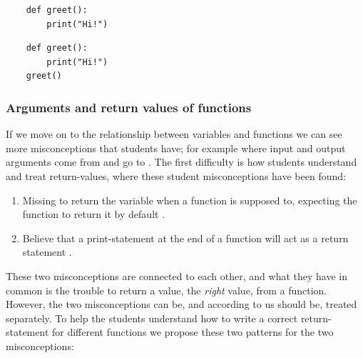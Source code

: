 \hfill
\begin{minipage}[t]{0.45\columnwidth}
  \begin{verbatim}
    def greet():
        print("Hi!")
  \end{verbatim}
\end{minipage}
\hfill
\begin{minipage}[t]{0.45\columnwidth}
  \begin{verbatim}
    def greet():
        print("Hi!")
    greet()
  \end{verbatim}
\end{minipage}

\subsubsection{Arguments and return values of functions}

If we move on to the relationship between variables and functions we can 
see 
more misconceptions that students have; for example where input and output 
arguments 
come from and go to \autocite{Ragonis2005OOP}.
The first difficulty is how students understand and treat return-values, 
where these student misconceptions have been found: 

\begin{enumerate}
    \item Missing to return the variable when a function is supposed to, 
expecting the function to return it by default \autocite{
Kurvinen2016,KumarVeerasamy2016}.

    \item Believe that a print-statement at the end of a function will act 
as a return statement \autocite{MisconceptionsSurvey2017}.

\end{enumerate}
 

These two misconceptions are connected to each other, and what they have 
in common is the trouble to return a value, the \emph{right} value, from a 
function. However, the two misconceptions can be, and according to us 
should be, treated separately. To help the students understand how to 
write a correct return-statement for different functions we propose these 
two patterns for the two misconceptions:

